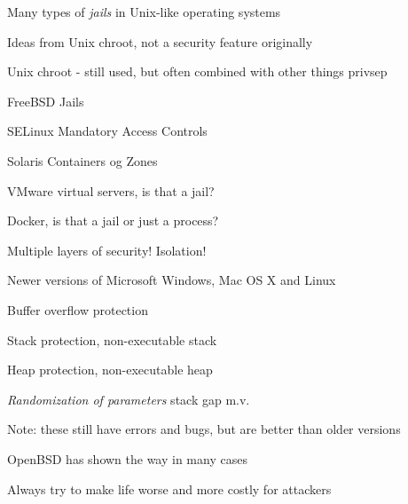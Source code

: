 \documentclass[Screen16to9,17pt]{foils}
\begin{document}

\begin{list1}
\item Many types of \emph{jails} in Unix-like operating systems
\item Ideas from Unix chroot, not a security feature originally
\begin{list2}
\item Unix chroot - still used, but often combined with other things privsep
\item FreeBSD Jails
\item SELinux Mandatory Access Controls
\item Solaris Containers og Zones
\item VMware virtual servers, is that a jail?
\item Docker, is that a jail or just a process?
\end{list2}
\end{list1}



\centerline{\hlkbig\color{security6blue} Multiple layers of security! Isolation!}



\begin{list1}
\item Newer versions of Microsoft Windows, Mac OS X and Linux
\begin{list2}
\item Buffer overflow protection
\item Stack protection, non-executable stack
\item Heap protection, non-executable heap
\item \emph{Randomization of parameters} stack gap m.v.
\end{list2}
\item Note: these still have errors and bugs, but are better than older versions
\item OpenBSD has shown the way in many cases\\ 
\end{list1}

\vskip 1cm

\centerline{Always try to make life worse and more costly for attackers}


\slidenext{}
\end{document}
